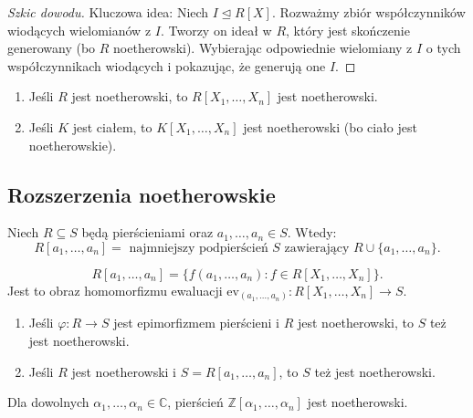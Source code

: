 \begin{proof}[Szkic dowodu]
Kluczowa idea: Niech $I \trianglelefteq R[X]$. Rozważmy zbiór współczynników wiodących wielomianów z $I$. Tworzy on ideał w $R$, który jest skończenie generowany (bo $R$ noetherowski). Wybierając odpowiednie wielomiany z $I$ o tych współczynnikach wiodących i pokazując, że generują one $I$.
\end{proof}

\begin{corollary}
\begin{enumerate}[label=\arabic*)]
    \item Jeśli $R$ jest noetherowski, to $R[X_1, \dots, X_n]$ jest noetherowski.
    \item Jeśli $K$ jest ciałem, to $K[X_1, \dots, X_n]$ jest noetherowski (bo ciało jest noetherowskie).
\end{enumerate}
\end{corollary}

\subsection*{Rozszerzenia noetherowskie}

\begin{definition}
Niech $R \subseteq S$ będą pierścieniami oraz $a_1, \dots, a_n \in S$. Wtedy:
\[
R[a_1, \dots, a_n] = \text{ najmniejszy podpierścień } S \text{ zawierający } R \cup \{a_1, \dots, a_n\}.
\]
\end{definition}

\begin{remark}
\[
R[a_1, \dots, a_n] = \{f(a_1, \dots, a_n) : f \in R[X_1, \dots, X_n]\}.
\]
Jest to obraz homomorfizmu ewaluacji $\text{ev}_{(a_1,\dots,a_n)}: R[X_1,\dots,X_n] \to S$.
\end{remark}

\begin{theorem}
\begin{enumerate}[label=\arabic*)]
    \item Jeśli $\varphi: R \to S$ jest epimorfizmem pierścieni i $R$ jest noetherowski, to $S$ też jest noetherowski.
    \item Jeśli $R$ jest noetherowski i $S = R[a_1, \dots, a_n]$, to $S$ też jest noetherowski.
\end{enumerate}
\end{theorem}

\begin{corollary}
Dla dowolnych $\alpha_1, \dots, \alpha_n \in \mathbb{C}$, pierścień $\mathbb{Z}[\alpha_1, \dots, \alpha_n]$ jest noetherowski.
\end{corollary}

